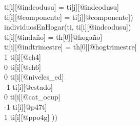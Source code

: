 {    ti[i][@indcodusu] = ti[j][@indcodusu] \y\\
    ti[i][@componente] = ti[j][@componente]) \y\\
    individuosEnHogar(ti, ti[i][@indcodusu])  \y\\
    ti[i][@indaño] = th[0][@hogaño] \y\\
    ti[i][@indtrimestre] = th[0][@hogtrimestre] \y\\
    1 \leq ti[i][@ch4]  \y\\
    0 \leq ti[i][@ch6] \y\\
    0 \leq ti[i][@niveles\_ed]  \y\\
    -1 \leq ti[i][@estado]  \y\\
    0 \leq ti[i][@cat\_ocup]  \y\\
    -1 \leq ti[i][@p47t] \y\\
    1 \leq ti[i][@ppo4g] ))}